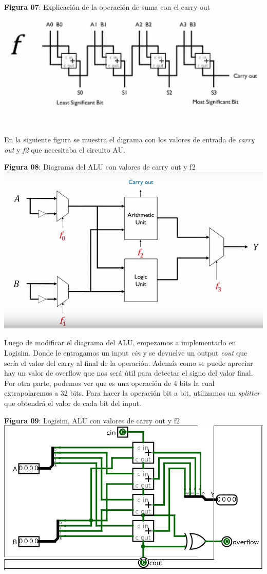 \documentclass[11pt]{article}
\begin{document}
\begin{question}
{	\begin{center} \textbf{Figura 07}: Explicación de la operación de suma con el carry out 
		\includegraphics[scale=0.4]{IMAGES_06}
	\end{center}
	En la siguiente figura se muestra el digrama con los valores de entrada de \textit{carry out} y \textit{f2} que necesitaba el circuito AU.
	\begin{center} \textbf{Figura 08}: Diagrama del ALU con valores de carry out y f2 
		\includegraphics[scale=0.4]{IMAGES_08}
	\end{center}
	Luego de modificar el diagrama del ALU, empezamos a implementarlo en Logisim. Donde le entragamos un input \textit{cin} y se devuelve un output \textit{cout} que sería el valor del carry al final de la operación. Además como se puede apreciar hay un valor de overflow que nos será útil para detectar el signo del valor final. Por otra parte, podemos ver que es una operación de 4 bits la cual extrapolaremos a 32 bits. Para hacer la operación bit a bit, utilizamos un \textit{splitter} que obtendrá el valor de cada bit del input.
	\begin{center} \textbf{Figura 09}: Logisim, ALU con valores de carry out y f2 
		\includegraphics[scale=0.4]{IMAGES_11}

\end{center}}
\end{question}
\end{document}
